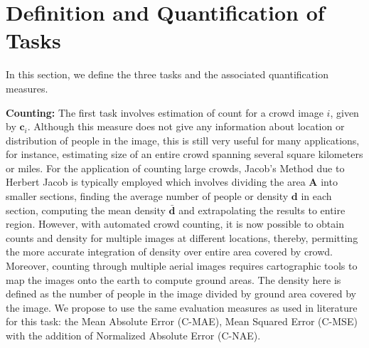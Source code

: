 \documentclass[runningheads]{llncs}
\begin{document}
\begin{comment}
Figure \ref{figCountStats} shows the absolute counts and average density per pixel for each image in the dataset.
\begin{figure*}[t]
\centering
\texttt{[image: figures/countStats.pdf]}
\caption{The figure shows two graphs overall the images in the dataset. The y-axis shows the absolute count (top) and average density per pixel (bottom) for all the images, where x-axes in both graphs shows the image number, sorted according to the two measures, respectively. The red color indicates training images, while blue color represents testing images.}
\label{figCountStats}
\end{figure*}
\end{comment}


\section{Definition and Quantification of Tasks}\label{secTasks}
In this section, we define the three tasks and the associated quantification measures.


\noindent\textbf{Counting:} The first task involves estimation of count for a crowd image $i$, given by $\mathbf{c}_i$. Although this measure does not give any information about location or distribution of people in the image, this is still very useful for many applications, for instance, estimating size of an entire crowd spanning several square kilometers or miles. For the application of counting large crowds, Jacob's Method \cite{jacobmethod67} due to Herbert Jacob is typically employed which involves dividing the area $\mathbf{A}$ into smaller sections, finding the average number of people or density $\mathbf{d}$ in each section, computing the mean density $\bar{\mathbf{d}}$ and extrapolating the results to entire region. However, with automated crowd counting, it is now possible to obtain counts and density for multiple images at different locations, thereby, permitting the more accurate integration of density over entire area covered by crowd. Moreover, counting through multiple aerial images requires cartographic tools to map the images onto the earth to compute ground areas. The density here is defined as the number of people in the image divided by ground area covered by the image. We propose to use the same evaluation measures as used in literature for this task: the Mean Absolute Error (C-MAE), Mean Squared Error (C-MSE) with the addition of Normalized Absolute Error (C-NAE).
\end{document}
